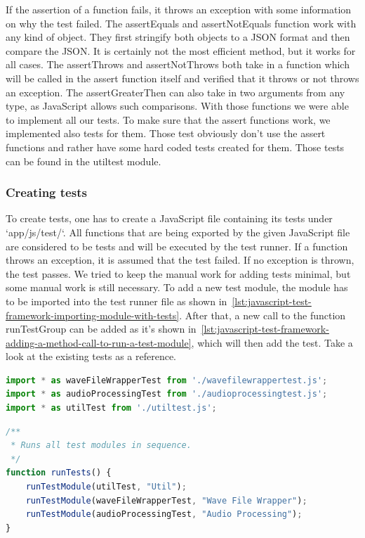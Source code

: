 If the assertion of a function fails, it throws an exception with some information on why the test failed.
The assertEquals and assertNotEquals function work with any kind of object.
They first stringify both objects to a JSON format and then compare the JSON.
It is certainly not the most efficient method, but it works for all cases.
The assertThrows and assertNotThrows both take in a function which will be called in the assert function itself and verified that it throws or not throws an exception.
The assertGreaterThen can also take in two arguments from any type, as JavaScript allows such comparisons.
With those functions we were able to implement all our tests.
To make sure that the assert functions work, we implemented also tests for them.
Those test obviously don't use the assert functions and rather have some hard coded tests created for them.
Those tests can be found in the utiltest module.

\subsubsection{Creating tests}
To create tests, one has to create a JavaScript file containing its tests under `app/js/test/`.
All functions that are being exported by the given JavaScript file are considered to be tests and will be executed by the test runner.
If a function throws an exception, it is assumed that the test failed.
If no exception is thrown, the test passes.
We tried to keep the manual work for adding tests minimal, but some manual work is still necessary.
To add a new test module, the module has to be imported into the test runner file as shown in~\autoref{lst:javascript-test-framework-importing-module-with-tests}.
After that, a new call to the function runTestGroup can be added as it's shown in~\autoref{lst:javascript-test-framework-adding-a-method-call-to-run-a-test-module}, which will then add the test.
Take a look at the existing tests as a reference.

\begin{lstlisting}[caption={Importing a module with tests},label={lst:javascript-test-framework-importing-module-with-tests},language=JavaScript]
import * as waveFileWrapperTest from './wavefilewrappertest.js';
import * as audioProcessingTest from './audioprocessingtest.js';
import * as utilTest from './utiltest.js';
\end{lstlisting}

\begin{lstlisting}[caption={Adding a method call to run a test module},label={lst:javascript-test-framework-adding-a-method-call-to-run-a-test-module},language=JavaScript]
/**
 * Runs all test modules in sequence.
 */
function runTests() {
    runTestModule(utilTest, "Util");
    runTestModule(waveFileWrapperTest, "Wave File Wrapper");
    runTestModule(audioProcessingTest, "Audio Processing");
}
\end{lstlisting}

